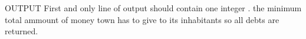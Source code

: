 OUTPUT
First and only line of output should contain one integer . the minimum total ammount of money town  has to give to its inhabitants so all debts are returned.